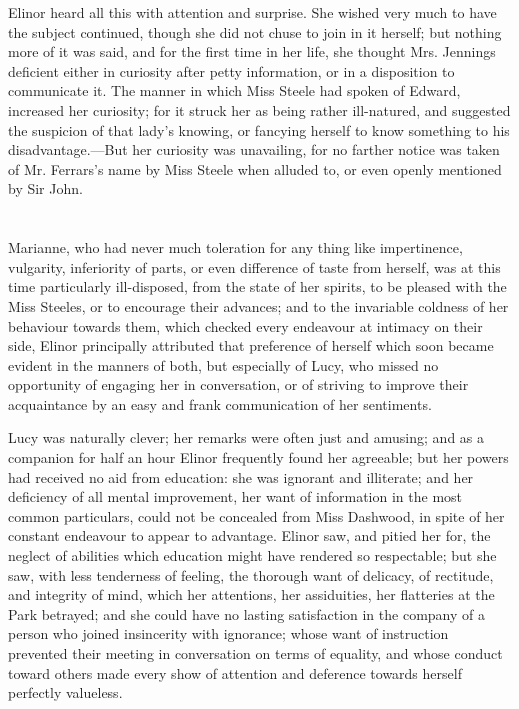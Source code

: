 Elinor heard all this with attention and surprise.  She wished very much to have the subject continued, though she did not chuse to join in it herself; but nothing more of it was said, and for the first time in her life, she thought Mrs. Jennings deficient either in curiosity after petty information, or in a disposition to communicate it. The manner in which Miss Steele had spoken of Edward, increased her curiosity; for it struck her as being rather ill-natured, and suggested the suspicion of that lady's knowing, or fancying herself to know something to his disadvantage.---But her curiosity was unavailing, for no farther notice was taken of Mr. Ferrars's name by Miss Steele when alluded to, or even openly mentioned by Sir John.

\chapter{} %

Marianne, who had never much toleration for any thing like impertinence, vulgarity, inferiority of parts, or even difference of taste from herself, was at this time particularly ill-disposed, from the state of her spirits, to be pleased with the Miss Steeles, or to encourage their advances; and to the invariable coldness of her behaviour towards them, which checked every endeavour at intimacy on their side, Elinor principally attributed that preference of herself which soon became evident in the manners of both, but especially of Lucy, who missed no opportunity of engaging her in conversation, or of striving to improve their acquaintance by an easy and frank communication of her sentiments.

Lucy was naturally clever; her remarks were often just and amusing; and as a companion for half an hour Elinor frequently found her agreeable; but her powers had received no aid from education: she was ignorant and illiterate; and her deficiency of all mental improvement, her want of information in the most common particulars, could not be concealed from Miss Dashwood, in spite of her constant endeavour to appear to advantage. Elinor saw, and pitied her for, the neglect of abilities which education might have rendered so respectable; but she saw, with less tenderness of feeling, the thorough want of delicacy, of rectitude, and integrity of mind, which her attentions, her assiduities, her flatteries at the Park betrayed; and she could have no lasting satisfaction in the company of a person who joined insincerity with ignorance; whose want of instruction prevented their meeting in conversation on terms of equality, and whose conduct toward others made every show of attention and deference towards herself perfectly valueless.

